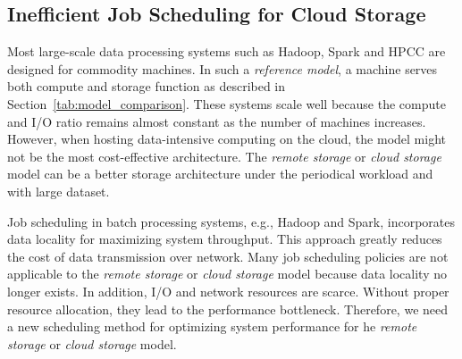 \subsection{Inefficient Job Scheduling for Cloud Storage}
Most large-scale data processing systems such as Hadoop, Spark and HPCC
are designed for commodity machines.
In such a \emph{reference model}, a machine serves
both compute and storage function
as described in Section~\ref{tab:model_comparison}.
These systems scale well because the compute and I/O ratio remains
almost constant as the number of machines increases.
However, when hosting data-intensive computing on the cloud, the model might not
be the most cost-effective architecture.
The \emph{remote storage} or \emph{cloud storage} model can be a better
storage architecture under the periodical workload and with large dataset.

Job scheduling in batch processing systems, e.g., Hadoop and Spark,
incorporates data locality for maximizing system throughput.
This approach greatly reduces the cost of data transmission over network.
Many job scheduling policies are not applicable to
the \emph{remote storage} or \emph{cloud storage} model because
data locality no longer exists.
In addition, I/O and network resources are scarce.
Without proper resource allocation, they lead to the performance bottleneck.
Therefore, we need a new scheduling method for optimizing system performance
for he \emph{remote storage} or \emph{cloud storage} model.
